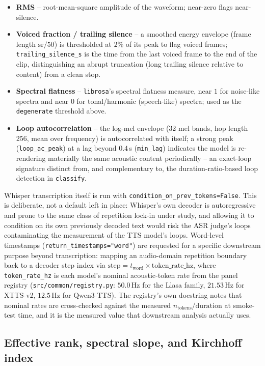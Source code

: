 \documentclass[11pt]{article}
\begin{document}
\begin{itemize}
\item \textbf{RMS} -- root-mean-square amplitude of the waveform; near-zero
  flags near-silence.
\item \textbf{Voiced fraction / trailing silence} -- a smoothed energy
  envelope (frame length $\mathrm{sr}/50$) is thresholded at $2\%$ of its
  peak to flag voiced frames; \texttt{trailing\_silence\_s} is the time from
  the last voiced frame to the end of the clip, distinguishing an abrupt
  truncation (long trailing silence relative to content) from a clean
  stop.
\item \textbf{Spectral flatness} -- \texttt{librosa}'s spectral flatness
  measure, near $1$ for noise-like spectra and near $0$ for tonal/harmonic
  (speech-like) spectra; used as the \texttt{degenerate} threshold above.
\item \textbf{Loop autocorrelation} -- the log-mel envelope (32 mel bands,
  hop length 256, mean over frequency) is autocorrelated with itself; a
  strong peak (\texttt{loop\_ac\_peak}) at a lag beyond $0.4\,$s
  (\texttt{min\_lag}) indicates the model is re-rendering materially the same
  acoustic content periodically -- an exact-loop signature distinct from,
  and complementary to, the duration-ratio-based loop detection in
  \texttt{classify}.
\end{itemize}

Whisper transcription itself is run with
\texttt{condition\_on\_prev\_tokens=False}. This is deliberate, not a default
left in place: Whisper's own decoder is autoregressive and prone to the same
class of repetition lock-in under study, and allowing it to condition on its
own previously decoded text would risk the ASR judge's loops contaminating
the measurement of the TTS model's loops. Word-level timestamps
(\texttt{return\_timestamps="word"}) are requested for a specific downstream
purpose beyond transcription: mapping an audio-domain repetition boundary
back to a decoder step index via $\text{step} = t_{\text{word}} \times
\text{token\_rate\_hz}$, where \texttt{token\_rate\_hz} is each model's
nominal acoustic-token rate from the panel registry
(\texttt{src/common/registry.py}: $50.0\,$Hz for the Llasa family,
$21.53\,$Hz for XTTS-v2, $12.5\,$Hz for Qwen3-TTS). The registry's own
docstring notes that nominal rates are cross-checked against the measured
$n_{\text{tokens}}/\text{duration}$ at smoke-test time, and it is the
measured value that downstream analysis actually uses.

\subsection{Effective rank, spectral slope, and Kirchhoff index}
\end{document}

